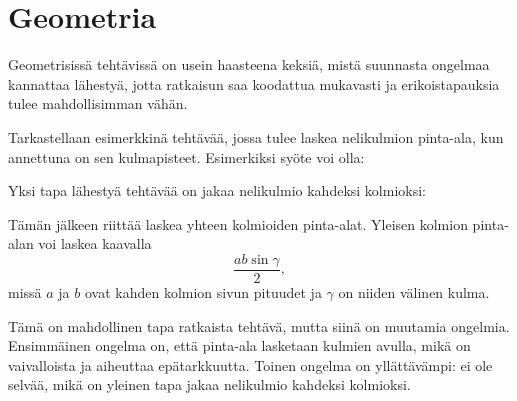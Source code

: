 \chapter{Geometria}

Geometrisissä tehtävissä on usein haasteena keksiä,
mistä suunnasta ongelmaa kannattaa lähestyä,
jotta ratkaisun saa koodattua mukavasti ja
erikoistapauksia tulee mahdollisimman vähän.

Tarkastellaan esimerkkinä tehtävää,
jossa tulee laskea nelikulmion pinta-ala,
kun annettuna on sen kulmapisteet.
Esimerkiksi syöte voi olla:

\begin{center}
\end{center}
Yksi tapa lähestyä tehtävää on jakaa nelikulmio
kahdeksi kolmioksi:
\begin{center}
\end{center}
Tämän jälkeen riittää laskea yhteen kolmioiden
pinta-alat. Yleisen kolmion pinta-alan voi laskea
kaavalla
\[\frac{ab \sin \gamma}{2},\]
missä $a$ ja $b$ ovat kahden kolmion sivun pituudet
ja $\gamma$ on niiden välinen kulma.

Tämä on mahdollinen tapa ratkaista tehtävä,
mutta siinä on muutamia ongelmia.
Ensimmäinen ongelma on, että pinta-ala
lasketaan kulmien avulla, mikä on vaivalloista
ja aiheuttaa epätarkkuutta.
Toinen ongelma on yllättävämpi:
ei ole selvää, mikä on yleinen tapa jakaa
nelikulmio kahdeksi kolmioksi.

